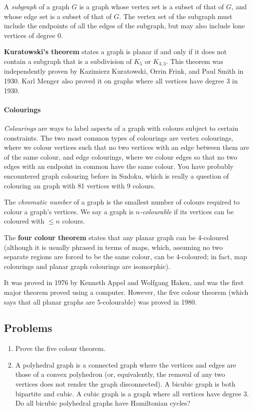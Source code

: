 \documentclass[11pt,a4paper]{report}
\newcounter{count}
\begin{document}
\begin{adjustwidth}{5cm}{5cm}
A \textit{subgraph} of a graph \(G\) is a graph whose vertex set is a subset of that of \(G\), and whose edge set is a subset of that of \(G\). The vertex set of the subgraph must include the endpoints of all the edges of the subgraph, but may also include lone vertices of degree 0.

\textbf{Kuratowski's theorem} states a graph is planar if and only if it does not contain a subgraph that is a subdivision of \(K_5\) or \(K_{3,3}\). This theorem was independently proven by Kazimierz Kuratowski, Orrin Frink, and Paul Smith in 1930. Karl Menger also proved it on graphs where all vertices have degree 3 in 1930.

\paragraph{Colourings}

\textit{Colourings} are ways to label aspects of a graph with colours subject to certain constraints. The two most common types of colourings are vertex colourings, where we colour vertices such that no two vertices with an edge between them are of the same colour, and edge colourings, where we colour edges so that no two edges with an endpoint in common have the same colour. You have probably encountered graph colouring before in Sudoku, which is really a question of colouring an graph with 81 vertices with 9 colours.

The \textit{chromatic number} of a graph is the smallest number of colours required to colour a graph's vertices. We say a graph is \textit{\(n\)-colourable} if its vertices can be coloured with \(\leq{}n\) colours.

The \textbf{four colour theorem} states that any planar graph can be 4-coloured (although it is usually phrased in terms of maps, which, assuming no two separate regions are forced to be the same colour, can be 4-coloured; in fact, map colourings and planar graph colourings are isomorphic).

It was proved in 1976 by Kenneth Appel and Wolfgang Haken, and was the first major theorem proved using a computer. However, the five colour theorem (which says that all planar graphs are 5-colourable) was proved in 1980.

\subsection{Problems}

\begin{enumerate}
	\item Prove the five colour theorem.
	\item A polyhedral graph is a connected graph where the vertices and edges are those of a convex polyhedron (or, equivalently, the removal of any two vertices does not render the graph disconnected). A bicubic graph is both bipartite and cubic. A cubic graph is a graph where all vertices have degree 3. Do all bicubic polyhedral graphs have Hamiltonian cycles?
\end{enumerate}


\end{adjustwidth}
\end{document}
